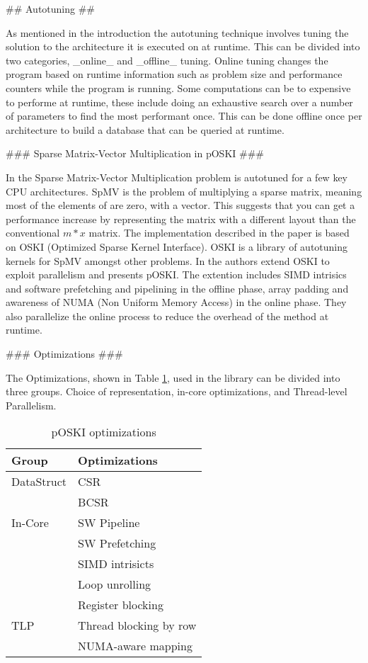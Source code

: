 \begin{markdown}

## Autotuning ##

As mentioned in the introduction the autotuning technique involves
tuning the solution to the architecture it is executed on at
runtime. This can be divided into two categories, _online_ and
_offline_ tuning. Online tuning changes the program based on
runtime information such as problem size and performance counters
while the program is running. Some computations can be to expensive to
performe at runtime, these include doing an exhaustive search over a
number of parameters to find the most performant once. This can be
done offline once per architecture to build a database that can be
queried at runtime.

### Sparse Matrix-Vector Multiplication in pOSKI ###

In \cite{auto} the Sparse Matrix-Vector Multiplication problem is
autotuned for a few key CPU architectures. SpMV is the problem of
multiplying a sparse matrix, meaning most of the elements of are zero,
with a vector. This suggests that you can get a performance increase
by representing the matrix with a different layout than the
conventional $m*x$ matrix. The implementation described in the paper
is based on OSKI \cite{oski} (Optimized Sparse Kernel Interface). OSKI
is a library of autotuning kernels for SpMV amongst other problems.
In \cite{auto} the authors extend OSKI to exploit parallelism and
presents pOSKI. The extention includes SIMD intrisics and software
prefetching and pipelining in the offline phase, array padding and
awareness of NUMA (Non Uniform Memory Access) in the online
phase. They also parallelize the online process to reduce the overhead
of the method at runtime.

### Optimizations  ###

The Optimizations, shown in Table \ref{tab:poksi}, used in the library can be divided into three
groups. Choice of representation, in-core optimizations, and
Thread-level Parallelism.

\begin{table}[H]
  \centering
  \begin{tabular}[H]{|l|l|}
    \hline
    Group      & Optimizations\\
    \hline
    \hline
    DataStruct & CSR\\
    & BCSR\\
    \hline
    In-Core& SW Pipeline\\
    & SW Prefetching\\
    & SIMD intrisicts\\
    & Loop unrolling\\
    & Register blocking\\
    \hline
    TLP&Thread blocking by row\\
    &NUMA-aware mapping\\
    \hline
  \end{tabular}
  \label{tab:poksi}
  \caption{pOSKI optimizations}
\end{table}


\end{markdown}
